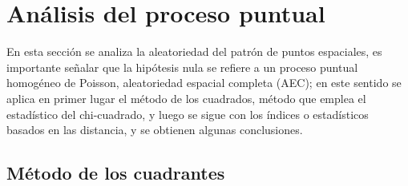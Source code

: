 \documentclass[12pt]{report}
\begin{document}
{{{{{{{{{{{{{{{		%
		
		
		
		
		
	
				
				\section{Análisis del proceso puntual}{\label{Puntuales} }
				
			   
			   
	 En esta sección se analiza la aleatoriedad del patrón de puntos espaciales, es importante señalar que la hipótesis nula se refiere a un proceso puntual  homogéneo de Poisson, aleatoriedad espacial completa (AEC); en este sentido se aplica en primer lugar el método de los cuadrados, método que emplea el estadístico del chi-cuadrado, y luego se sigue con los índices o estadísticos basados en las distancia, y se obtienen algunas conclusiones.
			   
				\subsection{Método de los cuadrantes}\label{cuadrante}		
					
}}}}}}}}}}}}}}}
\end{document}
